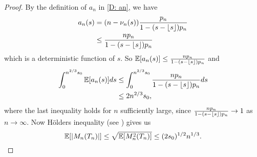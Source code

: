 \begin{proof}
	By the definition of $a_n$ in \eqref{D: an}, we have
	\begin{equation}
	\begin{aligned}
	a_n(s) &= (n - \nu_n(s)) \frac{p_n}{1 - (s - \lfloor s\rfloor)p_n} \\
	&\leq \frac{n p_n}{1 - (s - \lfloor s\rfloor)p_n}
	\end{aligned}
	\end{equation}
	which is a deterministic function of $s$. So
	$ \mathbb{E}[a_n(s)] \leq \frac{n p_n}{1 - (s - \lfloor s\rfloor)p_n} $
	and
	\begin{equation}
	\begin{aligned}
	\int_{0}^{n^{2 / 3}s_0} \mathbb{E}[a_n(s)] ds 
	&\leq \int_{0}^{n^{2 / 3}s_0}\frac{n p_n}{1 - (s - \lfloor s\rfloor)p_n}ds \\
	&\leq 2n^{2 / 3}s_0,
	\end{aligned}
	\end{equation}
	where the last inequality holds for $n$ sufficiently large, since 
	$\frac{n p_n}{1 - (s - \lfloor s\rfloor)p_n} \rightarrow 1$
	as $n \rightarrow \infty$.
	Now Hölders inequality (see \cite[p.113]{Royden.1969}) gives us
	\begin{equation} \label{E: Exp(Mn)}
	\mathbb{E}[|M_n(T_n)|] \leq \sqrt{\mathbb{E}[M^2_n(T_n)]} \leq (2s_0)^{1/2}n^{1 / 3}.
	\end{equation}
	

\end{proof}
